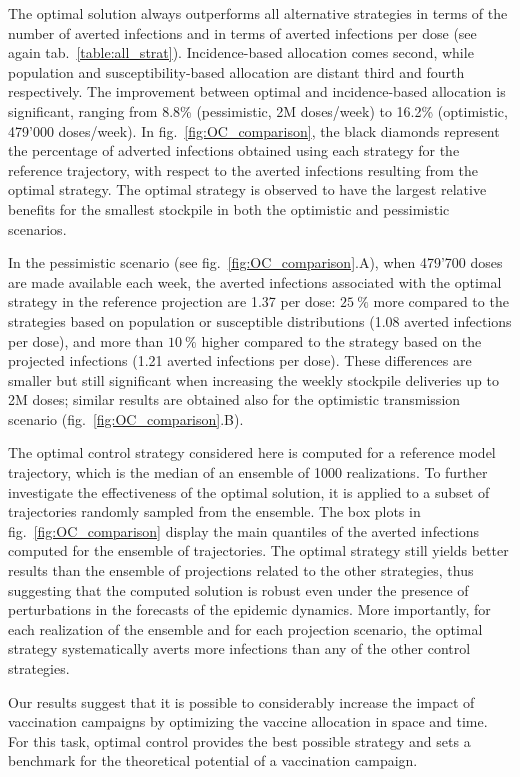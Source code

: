 The optimal solution always outperforms all alternative strategies in terms of the number of averted infections and in terms of averted infections per dose (see again tab.~\ref{table:all_strat}). Incidence-based allocation comes second, while population and susceptibility-based allocation are distant third and fourth respectively. The improvement between optimal and incidence-based allocation is significant, ranging from 8.8\% (pessimistic, 2M doses/week) to 16.2\% (optimistic, 479'000 doses/week). In fig.~\ref{fig:OC_comparison}, the black diamonds represent the percentage of adverted infections obtained using each strategy for the reference trajectory, with respect to the averted infections resulting from the optimal strategy. The optimal strategy is observed to have the largest relative benefits for the smallest stockpile in both the optimistic and pessimistic scenarios. 

In the pessimistic scenario (see fig.~\ref{fig:OC_comparison}.A), when 479'700 doses are made available each week, the averted infections associated with the optimal strategy in the reference projection are 1.37 per dose: $25~\%$ more compared to the strategies based on population or susceptible distributions (1.08 averted infections per dose), and more than $10~\%$ higher compared to the strategy based on the projected infections (1.21 averted infections per dose). These differences are smaller but still significant when increasing the weekly stockpile deliveries up to 2M doses; similar results are obtained also for the optimistic transmission scenario (fig.~\ref{fig:OC_comparison}.B). 

The optimal control strategy considered here is computed for a reference model trajectory, which is the median of an ensemble of 1000 realizations. To further investigate the effectiveness of the optimal solution, it is applied to a subset of trajectories randomly sampled from the ensemble. The box plots in fig.~\ref{fig:OC_comparison} display the main quantiles of the averted infections computed for the ensemble of trajectories. The optimal strategy still yields better results than the ensemble of projections related to the other strategies, thus suggesting that the computed solution is robust even under the presence of perturbations in the forecasts of the epidemic dynamics. More importantly, for each realization of the ensemble and for each projection scenario, the optimal strategy systematically averts more infections than any of the other control strategies.

Our results suggest that it is possible to considerably increase the impact of vaccination campaigns by optimizing the vaccine allocation in space and time. For this task, optimal control provides the best possible strategy and sets a benchmark for the theoretical potential of a vaccination campaign.

